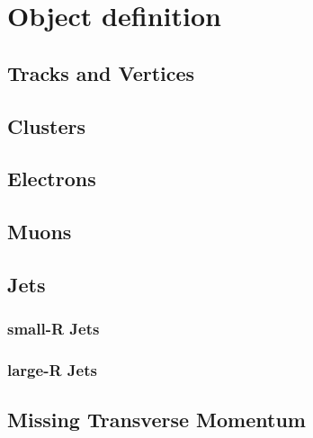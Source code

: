 \chapter{Object definition}
\section{Tracks and Vertices}
\section{Clusters}
\section{Electrons}
\section{Muons}
\section{Jets}
\subsection{small-R Jets}
\subsection{large-R Jets}
\section{Missing Transverse Momentum}

